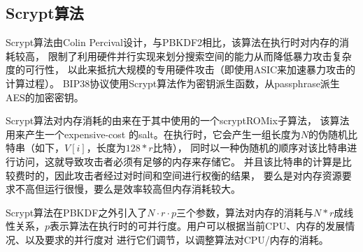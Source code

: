 \subsection{Scrypt算法}
Scrypt算法由Colin Percival设计，与PBKDF2相比，该算法在执行时对内存的消耗较高，
限制了利用硬件并行实现来划分搜索空间的能力从而降低暴力攻击复杂度的可行性，
以此来抵抗大规模的专用硬件攻击（即使用ASIC来加速暴力攻击的计算过程）。
BIP38协议使用Scrypt算法作为密钥派生函数，从passphrase派生AES的加密密钥。 

Scrypt算法对内存消耗的由来在于其中使用的一个scryptROMix子算法，
该算法用来产生一个expensive-cost 的salt。在执行时，它会产生一组长度为$N$的伪随机比特串（如下，$V[i]$，长度为$128*r$比特），
同时以一种伪随机的顺序对该比特串进行访问，这就导致攻击者必须有足够的内存来存储它。
并且该比特串的计算是比较费时的，因此攻击者经过对时间和空间进行权衡的结果，
要么是对内存资源要求不高但运行很慢，要么是效率较高但内存消耗较大。

Scrypt算法在PBKDF之外引入了$N\cdot r\cdot p$三个参数，算法对内存的消耗与$N*r$成线性关系，$p$表示算法在执行时的可并行度。用户可以根据当前CPU、内存的发展情况、以及要求的并行度对
进行它们调节，以调整算法对CPU/内存的消耗。


 

